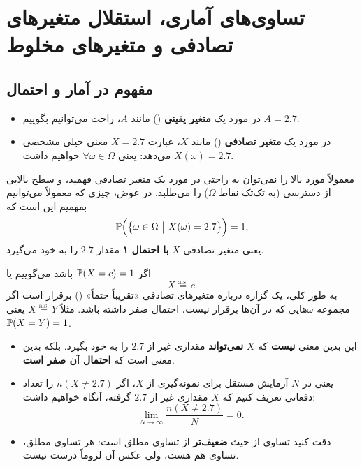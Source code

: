 \chapter{تساوی‌های آماری، استقلال متغیرهای تصادفی و متغیرهای مخلوط}

\section{مفهوم  در آمار و احتمال}

\begin{itemize}
\item در مورد یک \textbf{متغیر یقینی} () مانند $A$، راحت می‌توانیم بگوییم $A=2.7$.
\item در مورد یک \textbf{متغیر تصادفی} () مانند $X$، عبارت $X=2.7$ معنی خیلی مشخصی می‌دهد: یعنی $\forall\omega\in\Omega$ خواهیم داشت $X(\omega)=2.7$.
\end{itemize}
معمولاً مورد بالا را نمی‌توان به راحتی در مورد یک متغیر تصادفی فهمید، و سطح بالایی از دسترسی (به تک‌تک نقاط $\Omega$) را می‌طلبد. در عوض، چیزی که معمولاً می‌توانیم بفهمیم این است که
\[
\Prob\Big(\big\{\omega\in\Omega\ \big|\ X(\omega)=2.7\big\}\Big)=1,
\]
یعنی متغیر تصادفی $X$ \textbf{با احتمال ۱} مقدار $2.7$ را به خود می‌گیرد.

\begin{definition}
اگر $\mathbb{P}(X=c)=1$ باشد می‌گوییم  یا
\[
X\overset{\text{a.s.}}{=}c .
\]
به طور کلی، یک گزاره درباره متغیرهای تصادفی «تقریباً حتماً» () برقرار است اگر مجموعه $\omega$هایی که در آن‌ها برقرار نیست، احتمال صفر داشته باشد. مثلاً $X\overset{\text{a.s.}}{=}Y$ یعنی $\mathbb{P}(X=Y)=1$.
\end{definition}

\begin{itemize}
\item این بدین معنی \textcolor{red!70!black}{\textbf{نیست}} که $X$ \textcolor{red!70!black}{\textbf{نمی‌تواند}} مقداری غیر از $2.7$ را به خود بگیرد. بلکه بدین معنی است که \textcolor{blue!60!black}{\textbf{احتمال آن صفر است}}.
\item یعنی در $N$ آزمایش مستقل برای نمونه‌گیری از $X$، اگر $n(X\neq2.7)$ را تعداد دفعاتی تعریف کنیم که $X$ مقداری غیر از $2.7$ گرفته، آنگاه خواهیم داشت:
\[
\lim_{N\to\infty}\frac{n(X\neq2.7)}{N}=0 .
\]
\item دقت کنید تساوی از حیث  \textbf{ضعیف‌تر} از تساوی مطلق است: هر تساوی مطلق، تساوی  هم هست، ولی عکس آن لزوماً درست نیست.
\end{itemize}

